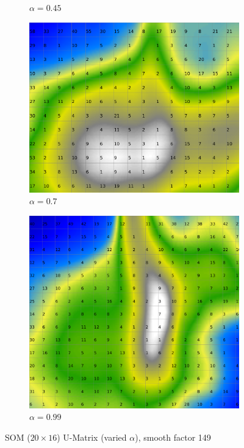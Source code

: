 \documentclass{acm_proc_article-sp}
\begin{document}
\begin{figure}
\begin{subfigure}[b]{0.24\linewidth}
        \caption{$\alpha=0.45$}
        \label{fig:wine-20x16-smoothed-data-histogram-alpha-0.45-f-149}
    \end{subfigure}
    \begin{subfigure}[b]{0.24\linewidth}
        \includegraphics[width=\linewidth]{img/wine-20x16-smoothed-data-histogram-alpha-0.7-f-149}
        \caption{$\alpha=0.7$}
        \label{fig:wine-20x16-smoothed-data-histogram-alpha-0.7-f-149}
    \end{subfigure}
    \begin{subfigure}[b]{0.24\linewidth}
        \includegraphics[width=\linewidth]{img/wine-20x16-smoothed-data-histogram-alpha-0.99-f-149}
        \caption{$\alpha=0.99$}
        \label{fig:wine-20x16-smoothed-data-histogram-alpha-0.99-f-149}
    \end{subfigure}
    \caption{SOM ($20\times16$) U-Matrix (varied $\alpha$), smooth factor 149}
    \label{fig:wine-20x16-smoothed-data-histogram-alpha-f-149}
\end{figure}
\end{document}
